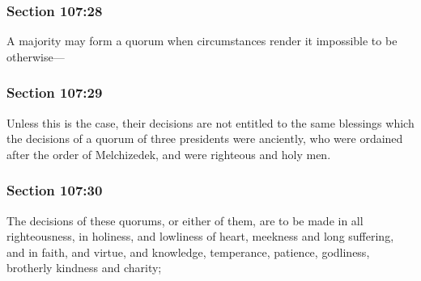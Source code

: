 	\subsubsection{Section 107:28} %
		\label{DC107-28}

		A majority may form a quorum when circumstances render it impossible to be otherwise---


	\subsubsection{Section 107:29} %
		\label{DC107-29}

		Unless this is the case, their decisions are not entitled to the same blessings which the decisions of a quorum of three presidents were anciently, who were ordained after the order of Melchizedek, and were righteous and holy men.


	\subsubsection{Section 107:30} %
		\label{DC107-30}

		The decisions of these quorums, or either of them, are to be made in all righteousness, in holiness, and lowliness of heart, meekness and long suffering, and in faith, and virtue, and knowledge, temperance, patience, godliness, brotherly kindness and charity;


